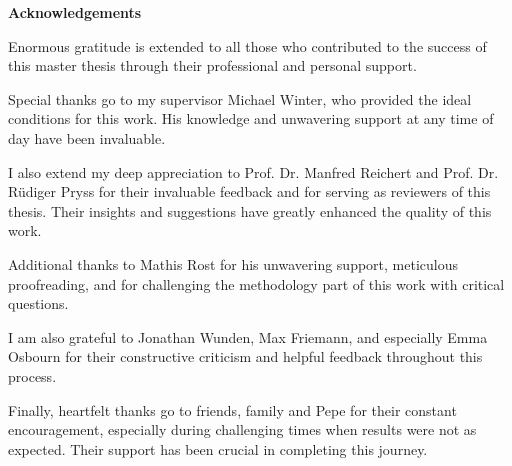 \newenvironment{acknowledgements}%
    {\cleardoublepage\thispagestyle{empty}\null\vfill\begin{center}%
    \bfseries Acknowledgements\end{center}}%
    {\vfill\null}
        \begin{acknowledgements}
        \footnotesize{Enormous gratitude is extended to all those who contributed to the success of this master thesis through their professional and personal support.

        Special thanks go to my supervisor Michael Winter, who provided the ideal conditions for this work. His knowledge and unwavering support at any time of day have been invaluable.

        I also extend my deep appreciation to Prof. Dr. Manfred Reichert and Prof. Dr. Rüdiger Pryss for their invaluable feedback and for serving as reviewers of this thesis. Their insights and suggestions have greatly enhanced the quality of this work.

        Additional thanks to Mathis Rost for his unwavering support, meticulous proofreading, and for challenging the methodology part of this work with critical questions.

        I am also grateful to Jonathan Wunden, Max Friemann, and especially Emma Osbourn for their constructive criticism and helpful feedback throughout this process.

        Finally, heartfelt thanks go to friends, family and Pepe for their constant encouragement, especially during challenging times when results were not as expected. Their support has been crucial in completing this journey.}
        \end{acknowledgements}
        \clearpage